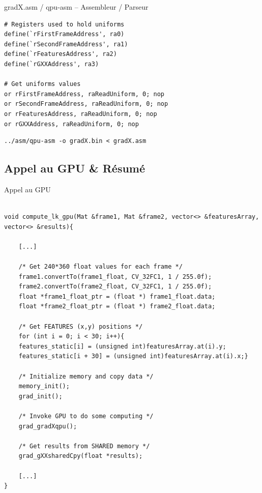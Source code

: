 \documentclass{bredelebeamer}
\begin{document}
\begin{frame}[fragile]{gradX.asm / qpu-asm -- Assembleur / Parseur}

\begin{lstlisting}
# Registers used to hold uniforms
define(`rFirstFrameAddress', ra0)
define(`rSecondFrameAddress', ra1)
define(`rFeaturesAddress', ra2)
define(`rGXXAddress', ra3)

# Get uniforms values
or rFirstFrameAddress, raReadUniform, 0; nop
or rSecondFrameAddress, raReadUniform, 0; nop
or rFeaturesAddress, raReadUniform, 0; nop
or rGXXAddress, raReadUniform, 0; nop
\end{lstlisting}

\begin{lstlisting}
../asm/qpu-asm -o gradX.bin < gradX.asm
\end{lstlisting}

\end{frame}



\subsection{Appel au GPU \& Résumé}


\begin{frame}[fragile]{Appel au GPU}

\begin{lstlisting}

void compute_lk_gpu(Mat &frame1, Mat &frame2, vector<> &featuresArray, vector<> &results){

	[...]

	/* Get 240*360 float values for each frame */
	frame1.convertTo(frame1_float, CV_32FC1, 1 / 255.0f);
	frame2.convertTo(frame2_float, CV_32FC1, 1 / 255.0f);
	float *frame1_float_ptr = (float *) frame1_float.data;
	float *frame2_float_ptr = (float *) frame2_float.data;

	/* Get FEATURES (x,y) positions */
	for (int i = 0; i < 30; i++){
	features_static[i] = (unsigned int)featuresArray.at(i).y;
	features_static[i + 30] = (unsigned int)featuresArray.at(i).x;}

	/* Initialize memory and copy data */
	memory_init();
	grad_init();

	/* Invoke GPU to do some computing */
	grad_gradXqpu();

	/* Get results from SHARED memory */
	grad_gXXsharedCpy(float *results);

	[...]
}
\end{lstlisting}

\end{frame}
\end{document}
